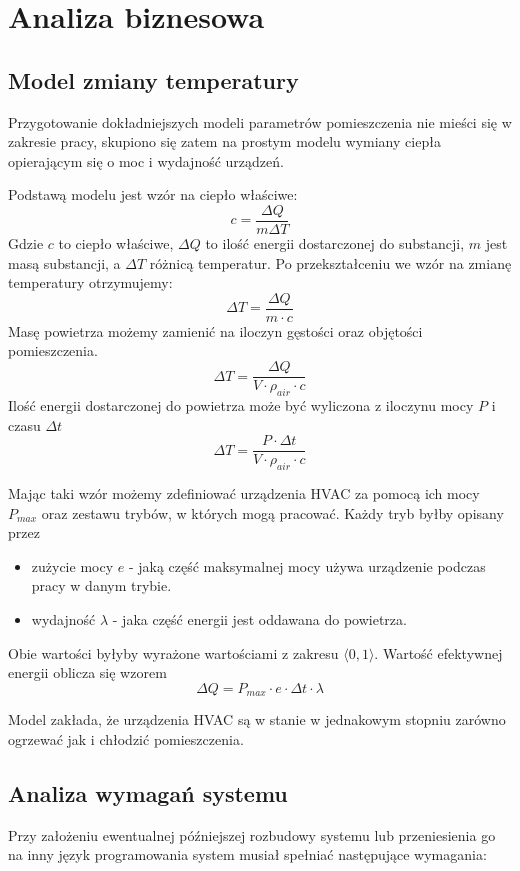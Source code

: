 \chapter{Analiza biznesowa}

\section{Model zmiany temperatury}
Przygotowanie dokładniejszych modeli parametrów pomieszczenia nie mieści się w zakresie pracy, skupiono się zatem na prostym modelu wymiany ciepła opierającym się o moc i wydajność urządzeń.

Podstawą modelu jest wzór na ciepło właściwe:
$$ c = \frac{\Delta Q}{m \Delta T} $$
Gdzie $c$ to ciepło właściwe, $\Delta Q$ to ilość energii dostarczonej do substancji, $m$ jest masą substancji, a $\Delta T$ różnicą temperatur.
Po przekształceniu we wzór na zmianę temperatury otrzymujemy:
$$ \Delta T = \frac{\Delta Q}{m \cdot c} $$
Masę powietrza możemy zamienić na iloczyn gęstości oraz objętości pomieszczenia.
$$ \Delta T = \frac{\Delta Q}{V \cdot \rho_{air} \cdot c} $$
Ilość energii dostarczonej do powietrza może być wyliczona z iloczynu mocy $P$ i czasu $\Delta t$
$$ \Delta T = \frac{P \cdot \Delta t}{V \cdot \rho_{air} \cdot c} $$

Mając taki wzór możemy zdefiniować urządzenia HVAC za pomocą ich mocy $P_{max}$ oraz zestawu trybów, w których mogą pracować.
Każdy tryb byłby opisany przez 
\begin{itemize}
    \item zużycie mocy $e$ - jaką część maksymalnej mocy używa urządzenie podczas pracy w danym trybie. 
    \item wydajność $\lambda$ - jaka część energii jest oddawana do powietrza. 
\end{itemize}
Obie wartości byłyby wyrażone wartościami z zakresu $\langle 0,1 \rangle$. Wartość efektywnej energii oblicza się wzorem
$$ \Delta Q = P_{max} \cdot e \cdot \Delta t \cdot \lambda $$

Model zakłada, że urządzenia HVAC są w stanie w jednakowym stopniu zarówno ogrzewać jak i chłodzić pomieszczenia. 

\section{Analiza wymagań systemu}
Przy założeniu ewentualnej późniejszej rozbudowy systemu lub przeniesienia go na inny język programowania system musiał spełniać następujące wymagania:

